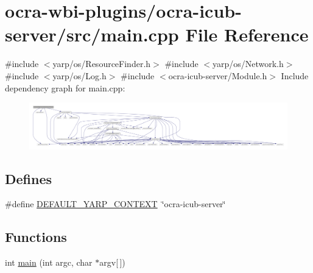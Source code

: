 \hypertarget{ocra-icub-server_2src_2main_8cpp}{\section{ocra-\/wbi-\/plugins/ocra-\/icub-\/server/src/main.cpp \-File \-Reference}
\label{ocra-icub-server_2src_2main_8cpp}
}
{\ttfamily \#include $<$yarp/os/\-Resource\-Finder.\-h$>$}\*
{\ttfamily \#include $<$yarp/os/\-Network.\-h$>$}\*
{\ttfamily \#include $<$yarp/os/\-Log.\-h$>$}\*
{\ttfamily \#include $<$ocra-\/icub-\/server/\-Module.\-h$>$}\*
\-Include dependency graph for main.\-cpp\-:
\nopagebreak
\begin{figure}[H]
\begin{center}
\leavevmode
\includegraphics[width=350pt]{ocra-icub-server_2src_2main_8cpp__incl}
\end{center}
\end{figure}
\subsection*{\-Defines}
\begin{DoxyCompactItemize}
\item 
\#define \hyperlink{ocra-icub-server_2src_2main_8cpp_aacf7b13861a4ce37b8dec1979eb6450c}{\-D\-E\-F\-A\-U\-L\-T\-\_\-\-Y\-A\-R\-P\-\_\-\-C\-O\-N\-T\-E\-X\-T}~\char`\"{}ocra-\/icub-\/server\char`\"{}
\end{DoxyCompactItemize}
\subsection*{\-Functions}
\begin{DoxyCompactItemize}
\item 
int \hyperlink{ocra-icub-server_2src_2main_8cpp_a0ddf1224851353fc92bfbff6f499fa97}{main} (int argc, char $\ast$argv\mbox{[}$\,$\mbox{]})
\end{DoxyCompactItemize}


